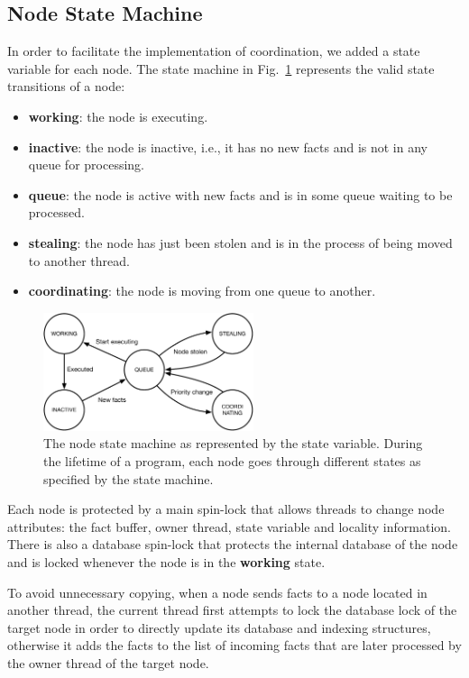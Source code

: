 \subsection{Node State Machine}

In order to facilitate the implementation of coordination, we added a state
variable for each node. The state machine in
Fig.~\ref{fig:implementation:node_states} represents the valid state transitions
of a node:

\begin{itemize}
   \item \textbf{working}: the node is executing.
   \item \textbf{inactive}: the node is inactive, i.e., it has no new facts and is not in any
   queue for processing.
   \item \textbf{queue}: the node is active with new facts and is in some queue waiting
   to be processed.
   \item \textbf{stealing}: the node has just been stolen and is in the process of being
   moved to another thread.
   \item \textbf{coordinating}: the node is moving from one queue to another.
\end{itemize}

\begin{figure}[ht]
   \centering
   \includegraphics[width=0.55\textwidth]{figures/implementation/node_states.pdf}
   \caption{The node state machine as represented by the state variable. During
      the lifetime of a program, each node goes through different states as
      specified by the state machine.}
   \label{fig:implementation:node_states}
\end{figure}

Each node is protected by a main spin-lock that allows threads to change node
attributes: the fact buffer, owner thread, state variable and locality
information. There is also a database spin-lock that protects the internal
database of the node and is locked whenever the node is in the \textbf{working}
state.  

To avoid unnecessary copying, when a node sends facts to a node located in
another thread, the current thread first attempts to lock the database lock of
the target node in order to directly update its database and indexing
structures, otherwise it adds the facts to the list of incoming facts that are
later processed by the owner thread of the target node.
